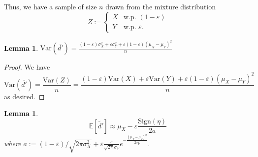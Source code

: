 \documentclass[10pt,onecolumn,letterpaper]{article}
\newtheorem{lem}[thm]{Lemma}
\newcommand{\ee}{\mathbb{E}}
\newcommand{\Var}{\mathrm{Var}}
\newcommand{\eps}{\varepsilon}
\begin{document}
Thus, we have a sample of size $n$ drawn from the mixture distribution $$Z :=\begin{cases}
    X &\text{w.p. }(1-\eps)\\
    Y &\text{w.p. }\eps.
\end{cases}$$

\begin{lem} \label{lem: var bar d'}
$\Var(\bar{d'}) = \frac{(1-\eps)\sigma_X^2 + \eps\sigma_Y^2 + \eps(1-\eps)(\mu_X - \mu_Y)^2}{n}$
\end{lem}
\begin{proof}
We have $$\Var(\bar{d'}) = \frac{\Var(Z)}{n} = \frac{(1-\eps)\Var(X) + \eps\Var(Y) + \eps(1-\eps)(\mu_X - \mu_Y)^2}{n}$$ as desired.
\end{proof}

\begin{lem} \label{lem: exp tilde d'}
$$\ee[\tilde{d'}] \approx \mu_X - \eps\frac{\mathrm{Sign}(\eta)}{2a}$$ where $a := (1-\eps)/\sqrt{2\pi\sigma_X^2} + \eps \frac{\eps}{\sqrt{2\pi}\sigma_Y}e^{-\frac{(\mu_X-\mu_Y)^2}{2\sigma_Y^2}}$.
\end{lem}
\end{document}
